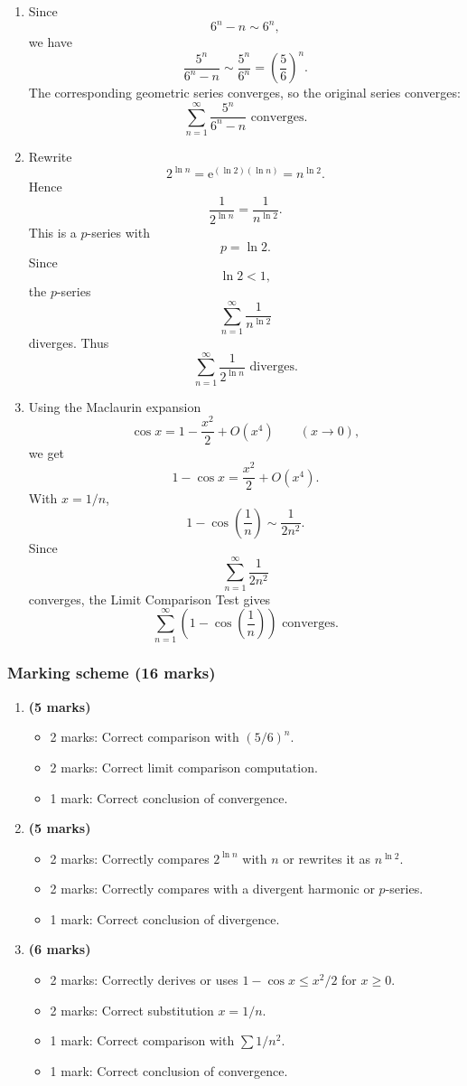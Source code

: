 \documentclass[12pt]{article}
\newcommand{\ee}{\mathrm{e}}
\begin{document}
\begin{enumerate}[label=(\alph*)]
\item Since
\[
6^n-n\sim 6^n,
\]
we have
\[
\frac{5^n}{6^n-n}
\sim
\frac{5^n}{6^n}
=
\left(\frac56\right)^n.
\]
The corresponding geometric series converges, so the original series converges:
\[
\boxed{\displaystyle
\sum_{n=1}^{\infty}\frac{5^n}{6^n-n}
\text{ converges}.}
\]

\item Rewrite
\[
2^{\ln n}
=
\ee^{(\ln 2)(\ln n)}
=
n^{\ln 2}.
\]
Hence
\[
\frac1{2^{\ln n}}
=
\frac1{n^{\ln 2}}.
\]
This is a $p$-series with
\[
p=\ln 2.
\]
Since
\[
\ln 2<1,
\]
the $p$-series
\[
\sum_{n=1}^{\infty}\frac1{n^{\ln 2}}
\]
diverges. Thus
\[
\boxed{\displaystyle
\sum_{n=1}^{\infty}\frac1{2^{\ln n}}
\text{ diverges}.}
\]

\item Using the Maclaurin expansion
\[
\cos x=1-\frac{x^2}{2}+O(x^4)
\qquad(x\to0),
\]
we get
\[
1-\cos x=\frac{x^2}{2}+O(x^4).
\]
With $x=1/n$,
\[
1-\cos\left(\frac1n\right)
\sim
\frac1{2n^2}.
\]
Since
\[
\sum_{n=1}^{\infty}\frac1{2n^2}
\]
converges, the Limit Comparison Test gives
\[
\boxed{\displaystyle
\sum_{n=1}^{\infty}\left(1-\cos\left(\frac1n\right)\right)
\text{ converges}.}
\]
\end{enumerate}

\subsubsection{Marking scheme (16 marks)}

\begin{enumerate}[label=(\alph*)]
\item \textbf{(5 marks)}
\begin{itemize}
\item 2 marks: Correct comparison with $(5/6)^n$.
\item 2 marks: Correct limit comparison computation.
\item 1 mark: Correct conclusion of convergence.
\end{itemize}

\item \textbf{(5 marks)}
\begin{itemize}
\item 2 marks: Correctly compares $2^{\ln n}$ with $n$ or rewrites it as $n^{\ln 2}$.
\item 2 marks: Correctly compares with a divergent harmonic or $p$-series.
\item 1 mark: Correct conclusion of divergence.
\end{itemize}

\item \textbf{(6 marks)}
\begin{itemize}
\item 2 marks: Correctly derives or uses $1-\cos x\le x^2/2$ for $x\ge0$.
\item 2 marks: Correct substitution $x=1/n$.
\item 1 mark: Correct comparison with $\sum 1/n^2$.
\item 1 mark: Correct conclusion of convergence.
\end{itemize}
\end{enumerate}
\end{document}
